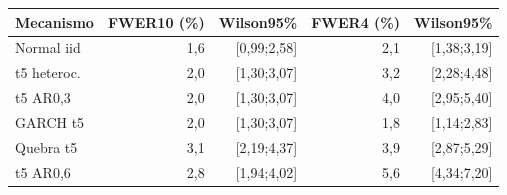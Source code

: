 \begin{tabular}{lrrrr}
\toprule
Mecanismo & FWER10 (\%) & Wilson95\% & FWER4 (\%) & Wilson95\%\\
\midrule
Normal iid & 1,6 & [0,99;2,58] & 2,1 & [1,38;3,19]\\
t5 heteroc. & 2,0 & [1,30;3,07] & 3,2 & [2,28;4,48]\\
t5 AR0,3 & 2,0 & [1,30;3,07] & 4,0 & [2,95;5,40]\\
GARCH t5 & 2,0 & [1,30;3,07] & 1,8 & [1,14;2,83]\\
Quebra t5 & 3,1 & [2,19;4,37] & 3,9 & [2,87;5,29]\\
t5 AR0,6 & 2,8 & [1,94;4,02] & 5,6 & [4,34;7,20]\\
\bottomrule
\end{tabular}
